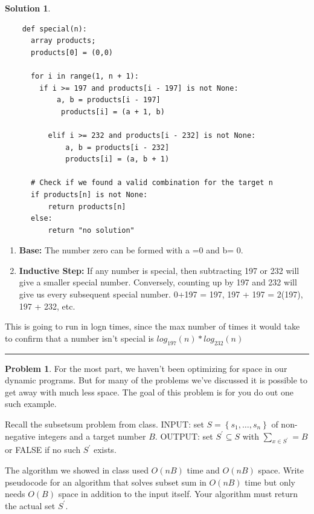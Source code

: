 \documentclass{article}
\theoremstyle{definition}
\newtheorem{problem}{Problem}
\def\fline{\rule{0.75\linewidth}{0.5pt}}
\newcommand{\finishline}{
  \begin{center}\fline
\end{center}}
\newtheorem*{solution*}{Solution}
\newenvironment{solution}{
\begin{solution*}}{{\finishline}
\end{solution*}}
\begin{document}
\begin{solution}

  \
    
  \begin{verbatim}
    def special(n):
      array products;
      products[0] = (0,0)

      for i in range(1, n + 1):
        if i >= 197 and products[i - 197] is not None:
            a, b = products[i - 197]
             products[i] = (a + 1, b)
              
          elif i >= 232 and products[i - 232] is not None:
              a, b = products[i - 232]
              products[i] = (a, b + 1)
              
      # Check if we found a valid combination for the target n
      if products[n] is not None:
          return products[n]
      else:
          return "no solution"
  \end{verbatim}
  \begin{enumerate}
    \item \textbf{Base: } The number zero can be formed with a =0 and b= 0.
    \item \textbf{Inductive Step: } If any number is special, then subtracting 197 or 232 will give a smaller special number. Conversely, counting up by 197 and 232 will give us every subsequent special number. 0+197 = 197, 197 + 197 = 2(197), 197 + 232, etc.
  \end{enumerate} 

  This is going to run in logn times, since the max number of times it would take to confirm that a number isn't special is $log_{197}(n) * log_{232}(n)$

\end{solution}

\newpage

\begin{problem}
  For the most part, we haven't been optimizing for space in our dynamic programs. But for many of the problems we've discussed it is possible to get away with much less space. The goal of this problem is for you do out one such example.

  Recall the subsetsum problem from class.
  INPUT: set $S=\left\{s_1, \ldots, s_n\right\}$ of non-negative integers and a target number $B$.
  OUTPUT: set $S^{\prime} \subseteq S$ with $\sum_{x \in S^{\prime}}=B$ or FALSE if no such $S^{\prime}$ exists.

  The algorithm we showed in class used $O(n B)$ time and $O(n B)$ space. Write pseudocode for an algorithm that solves subset sum in $O(n B)$ time but only needs $O(B)$ space in addition to the input itself. Your algorithm must return the actual set $S^{\prime}$.
\end{problem}
\end{document}

